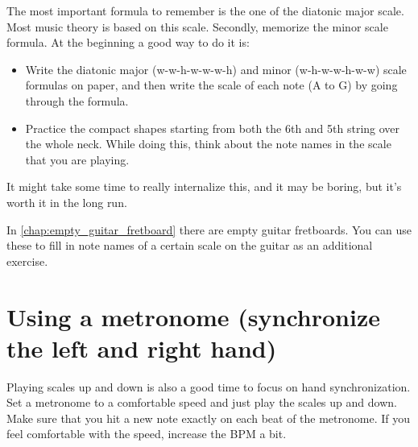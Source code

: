The most important formula to remember is the one of the diatonic major scale. Most music theory is based on this scale. Secondly, memorize the minor scale formula. At the beginning a good way to do it is:

\begin{itemize}
	\item Write the diatonic major (w-w-h-w-w-w-h) and minor (w-h-w-w-h-w-w) scale formulas on paper, and then write the scale of each note (A to G) by going through the formula.
	\item Practice the compact shapes starting from both the 6th and 5th string over the whole neck. While doing this, think about the note names in the scale that you are playing.
\end{itemize}

It might take some time to really internalize this, and it may be boring, but it's worth it in the long run.

In \autoref{chap:empty_guitar_fretboard} there are empty guitar fretboards. You can use these to fill in note names of a certain scale on the guitar as an additional exercise.

\section{Using a metronome (synchronize the left and right hand)}

Playing scales up and down is also a good time to focus on hand synchronization. Set a metronome to a comfortable speed and just play the scales up and down. Make sure that you hit a new note exactly on each beat of the metronome. If you feel comfortable with the speed, increase the BPM a bit.

